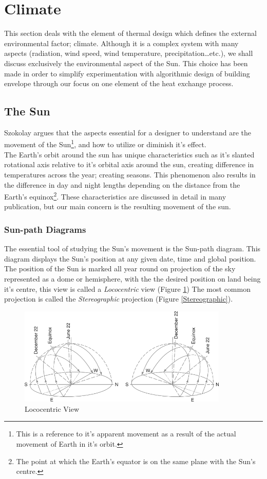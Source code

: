 \documentclass[a4paper,twoside,12pt,openright,final,oldfontcommands]{memoir}
\begin{document}
\section{Climate}
This section deals with the element of thermal design which defines the external environmental
factor; climate. Although it is a complex system with many aspects (radiation, wind speed, wind
temperature, precipitation\ldots etc.), we shall discuss exclusively the environmental aspect of the
Sun. This choice has been made in order to simplify experimentation with
algorithmic design of building envelope through our focus on one element of the heat exchange process.

\subsection{The Sun}
Szokolay \cite{szokolay08} argues that the aspects essential for a designer to understand are the
movement of the Sun\footnote{This is a reference to it's apparent movement as a result of the actual
movement of Earth in it's orbit.}, and how to utilize or diminish it's effect.\\
The Earth's orbit around the sun has unique characteristics such as it's slanted rotational axis
relative to it's orbital axis around the sun, creating difference in temperatures across the year;
creating seasons. This phenomenon also results in the difference in day and night lengths depending
on the distance from the Earth's equinox\footnote{The point at which the Earth's equator is on the
same plane with the Sun's centre.}. These characteristics are discussed in detail in many
publication, but our main concern is the resulting movement of the sun.

\subsubsection{Sun-path Diagrams}
The essential tool of studying the Sun's movement is the Sun-path diagram. This diagram displays the
Sun's position at any given date, time and global position. The position of the Sun is marked all
year round on projection of the sky represented as a dome or hemisphere, with the the desired
position on land being it's centre, this view is called a \emph{Lococentric} view (Figure
\ref{Lococentric}) The most common projection is called the \emph{Stereographic} projection (Figure
\ref{Stereographic}).

\begin{figure}[htbp]
\centering
\includegraphics[width=10cm]{./Images/3-Lococentric}
\caption[Lococentric Sun Path View]{Lococentric View \cite{szokolay08}}
\label{Lococentric}
\end{figure}
\end{document}
